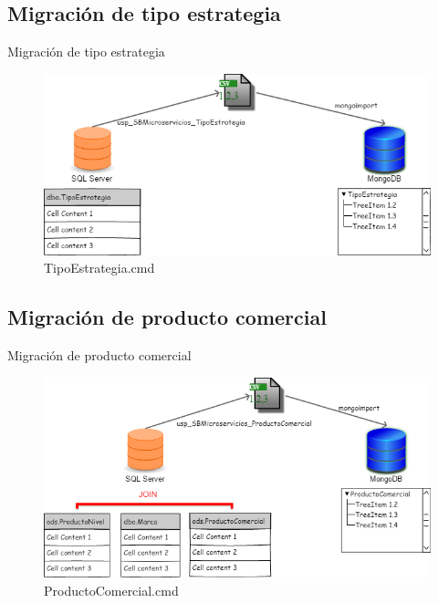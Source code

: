\documentclass{bredelebeamer}
\begin{document}
\subsection{Migración de tipo estrategia}
\begin{frame}{Migración de tipo estrategia}
\begin{figure}
\centering
\includegraphics[scale=0.35]{imgs/TipoEstrategia.png}
\caption{TipoEstrategia.cmd}
\end{figure}
\end{frame}

\subsection{Migración de producto comercial}
\begin{frame}{Migración de producto comercial}
\begin{figure}
\centering
\includegraphics[scale=0.35]{imgs/ProductoComercial.png}
\caption{ProductoComercial.cmd}
\end{figure}
\end{frame}
\end{document}
